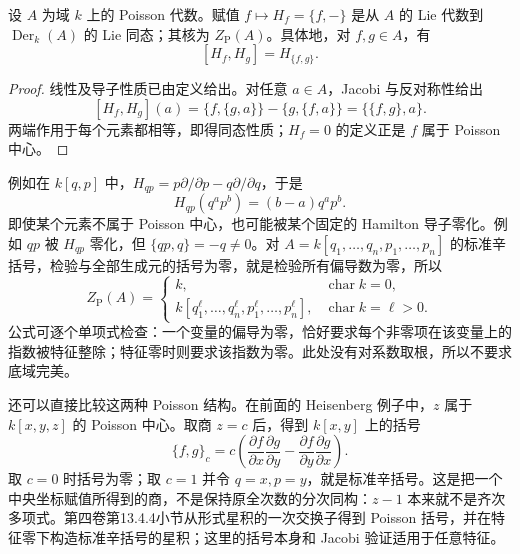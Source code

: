 \begin{proposition}\label{b5:prop:hamilton-derivation-commutator}
	设 \(A\) 为域 \(k\) 上的 Poisson 代数。赋值 \(f\mapsto H_f=\{f,-\}\) 是从 \(A\) 的 Lie 代数到 \(\operatorname{Der}_k(A)\) 的 Lie 同态；其核为 \(Z_{\mathrm P}(A)\)。具体地，对 \(f,g\in A\)，有
	\[
		[H_f,H_g]=H_{\{f,g\}}.
	\]
\end{proposition}
\begin{proof}
	线性及导子性质已由定义给出。对任意 \(a\in A\)，Jacobi 与反对称性给出
	\[
		[H_f,H_g](a)
		=\{f,\{g,a\}\}-\{g,\{f,a\}\}
		=\{\{f,g\},a\}.
	\]
	两端作用于每个元素都相等，即得同态性质；\(H_f=0\) 的定义正是 \(f\) 属于 Poisson 中心。
\end{proof}

例如在 \(k[q,p]\) 中，\(H_{qp}=p\partial/\partial p-q\partial/\partial q\)，于是
\[
	H_{qp}(q^ap^b)=(b-a)q^ap^b.
\]
即使某个元素不属于 Poisson 中心，也可能被某个固定的 Hamilton 导子零化。例如 \(qp\) 被 \(H_{qp}\) 零化，但 \(\{qp,q\}=-q\ne0\)。对 \(A=k[q_1,\ldots,q_n,p_1,\ldots,p_n]\) 的标准辛括号，检验与全部生成元的括号为零，就是检验所有偏导数为零，所以
\[
	Z_{\mathrm P}(A)=
	\begin{cases}
		k,&\operatorname{char}k=0,\\
		k[q_1^\ell,\ldots,q_n^\ell,p_1^\ell,\ldots,p_n^\ell],&\operatorname{char}k=\ell>0.
	\end{cases}
\]
公式可逐个单项式检查：一个变量的偏导为零，恰好要求每个非零项在该变量上的指数被特征整除；特征零时则要求该指数为零。此处没有对系数取根，所以不要求底域完美。

\ProseParagraphBreak
还可以直接比较这两种 Poisson 结构。在前面的 Heisenberg 例子中，\(z\) 属于 \(k[x,y,z]\) 的 Poisson 中心。取商 \(z=c\) 后，得到 \(k[x,y]\) 上的括号
\[
	\{f,g\}_c=c\left(
	\frac{\partial f}{\partial x}\frac{\partial g}{\partial y}
	-\frac{\partial f}{\partial y}\frac{\partial g}{\partial x}\right).
\]
取 \(c=0\) 时括号为零；取 \(c=1\) 并令 \(q=x,p=y\)，就是标准辛括号。这是把一个中央坐标赋值所得到的商，不是保持原全次数的分次同构：\(z-1\) 本来就不是齐次多项式。第四卷第13.4.4小节从形式星积的一次交换子得到 Poisson 括号，并在特征零下构造标准辛括号的星积；这里的括号本身和 Jacobi 验证适用于任意特征。

